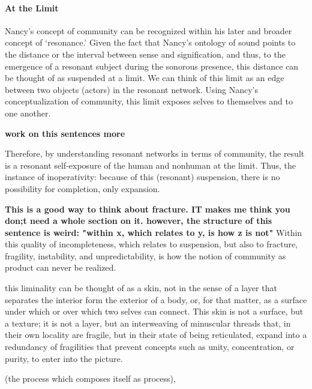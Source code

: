 \paragraph{At the Limit}
Nancy's concept of community can be recognized within his later and broader concept of `resonance.' Given the fact that Nancy's ontology of sound points to the distance or the interval between sense and signification, and thus, to the emergence of a resonant subject during the sonorous presence, this distance can be thought of as suspended at a limit. We can think of this limit as an edge between two objects (actors) in the resonant network. Using Nancy's conceptualization of community, this limit exposes selves to themselves and to one another. 

\textbf{work on this sentences more}

Therefore, by understanding resonant networks in terms of community, the result is a resonant self-exposure of the human and nonhuman at the limit. Thus, the instance of inoperativity: because of this (resonant) suspension, there is no possibility for completion, only expansion. 

\textbf{
This is a good way to think about fracture. 
IT makes me think you don;t need a whole section on it. 
however, the structure of this sentence is weird: 
"within x, which relates to y, is how z is not"
}
Within this quality of incompleteness, which relates to suspension, but also to fracture, fragility, instability, and unpredictability, is how the notion of community as product can never be realized.



this liminality can be thought of as a skin, not in the sense of a layer that separates the interior form the exterior of a body, or, for that matter, as a surface under which or over which two selves can connect. This skin is not a surface, but a texture; it is not a layer, but an interweaving of minuscular threads that, in their own locality are fragile, but in their state of being reticulated, expand into a redundancy of fragilities that prevent concepts such as unity, concentration, or purity, to enter into the picture. 











(the process which composes itself as process), 











